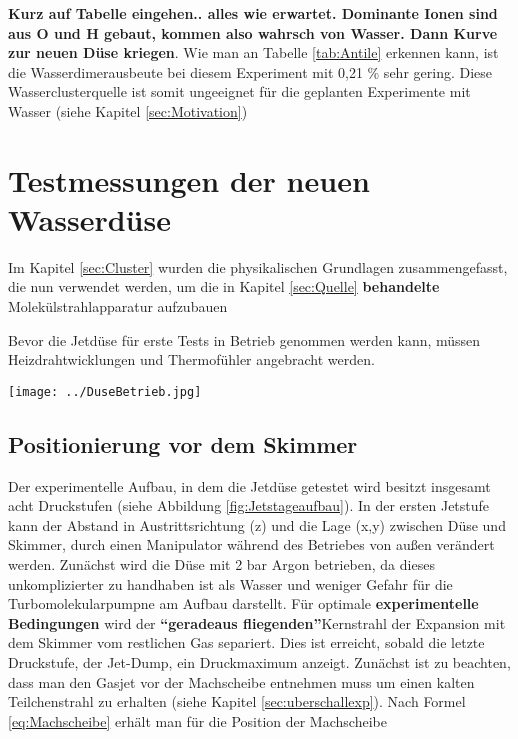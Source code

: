 \textbf{Kurz auf Tabelle eingehen.. alles wie erwartet. Dominante Ionen sind aus O und H gebaut, kommen also wahrsch von Wasser. Dann Kurve zur neuen Düse kriegen}.
Wie man an Tabelle \ref{tab:Antile} erkennen kann, ist die Wasserdimerausbeute bei diesem Experiment mit 0,21 \% sehr gering. Diese Wasserclusterquelle ist somit ungeeignet für die geplanten Experimente mit Wasser (siehe Kapitel \ref{sec:Motivation})

\section{Testmessungen der neuen Wasserdüse}

Im Kapitel \ref{sec:Cluster} wurden die physikalischen Grundlagen zusammengefasst, die nun verwendet werden, um die in Kapitel \ref{sec:Quelle} \textbf{behandelte} Molekülstrahlapparatur aufzubauen

Bevor die Jetdüse für erste Tests in Betrieb genommen werden kann, müssen Heizdrahtwicklungen und Thermofühler angebracht werden.

\begin{center}
\begin{minipage}{\linewidth}
\centering
\texttt{[image: ../DuseBetrieb.jpg]}%
 \label{fig:DuseBetrieb}
\end{minipage} 
\end{center} 

\subsection{Positionierung vor dem Skimmer}

Der experimentelle Aufbau, in dem die Jetdüse getestet wird besitzt insgesamt acht Druckstufen (siehe Abbildung \ref{fig:Jetstageaufbau}). In der ersten Jetstufe kann der Abstand in Austrittsrichtung (z) und die Lage (x,y) zwischen Düse und Skimmer, durch einen Manipulator während des Betriebes von außen verändert werden. Zunächst wird die Düse mit 2 bar Argon betrieben, da dieses unkomplizierter zu handhaben ist als Wasser und weniger Gefahr für die Turbomolekularpumpne am Aufbau darstellt. Für optimale \textbf{experimentelle Bedingungen} wird der \textbf{\enquote{geradeaus fliegenden}}Kernstrahl der Expansion mit dem Skimmer vom restlichen Gas separiert. Dies ist erreicht, sobald die letzte Druckstufe, der Jet-Dump, ein Druckmaximum anzeigt. Zunächst ist zu beachten, dass man den Gasjet vor der Machscheibe entnehmen muss um einen kalten Teilchenstrahl zu erhalten (siehe Kapitel \ref{sec:uberschallexp}). Nach Formel \ref{eq:Machscheibe} erhält man für die Position der Machscheibe

